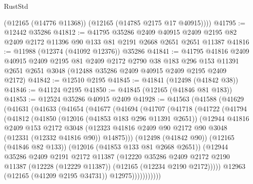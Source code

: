 \begin{lexlean}{RustStd}
\begin{coremodule}
        (@12165 (@14776 @11368))
        (@12165 (@14785 @2175 @17 @40915))))
@41795 := @12442 @35286
@41812 := @41795
    @35286
    @2409
    @40915
    @2409
    @2195
    @82
    @2409
    @2172
    @11396
    @90
    @133
    @81
    @2191
    @2668
    @2651
    @2651
    @11387
@41816 := @11988 (@12374 (@41092 @12376)) @35286
@41841 := @41795
    @41816
    @2409
    @40915
    @2409
    @2195
    @81
    @2409
    @2172
    @2790
    @38
    @183
    @296
    @153
    @11391
    @2651
    @2651
    @3048
    (@12488 @35286 @2409 @40915 @2409 @2195 @2409 @2172)
@41842 := @12510 @2195
@41845 := @41841 (@12498 (@41842 @38))
@41846 := @41124 @2195
@41850 := @41845 (@12165 (@41846 @81 @183))
@41853 := @12524 @35286 @40915 @2409
@41928 := @41563
    (@41588
      (@41629
        (@41631
          (@41633
            (@41654
              (@41677
                (@41694
                  (@41707
                    (@41718
                      (@41722
                        (@41794
                          (@41812
                            (@41850
                              (@12016 (@41853 @183 @296 @11391 @2651))
                              (@12944
                                @41816
                                @2409
                                @153
                                @2172
                                @3048
                                (@12323
                                  @41816
                                  @2409
                                  @90
                                  @2172
                                  @90
                                  @3048
                                  (@12331 (@12332 @41816 @90))
                                  @14875)))
                            (@12498 (@41842 @90))
                            (@12165 (@41846 @82 @133))
                            (@12016 (@41853 @133 @81 @2668 @2651))
                            (@12944
                              @35286
                              @2409
                              @2191
                              @2172
                              @11387
                              (@12220
                                @35286
                                @2409
                                @2172
                                @2190
                                @11387
                                (@12228 (@12229 @11387))
                                (@12165 (@12234 @2190 @2172)))))
                          @12963
                          (@12165 (@41209 @2195 @34731))
                          @12975)))))))))))

\end{coremodule}
\end{lexlean}
